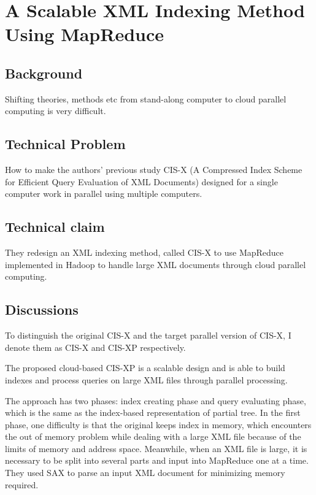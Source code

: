 \documentclass{paper}
\begin{document}
\section{A Scalable XML Indexing Method Using MapReduce}

\subsection{Background}

Shifting theories, methods etc from stand-along computer to cloud 
parallel computing is very difficult. 

\subsection{Technical Problem}

How to make the authors' previous study CIS-X (A Compressed Index
Scheme for Efficient Query Evaluation of XML Documents) designed for a
single computer work in parallel using multiple computers.
 
\subsection{Technical claim}

They redesign an XML indexing method, called CIS-X to use MapReduce
implemented in Hadoop to handle large XML documents through cloud
parallel computing.  

\subsection{Discussions}

To distinguish the original CIS-X and the target parallel version
of CIS-X, I denote them as CIS-X and CIS-XP respectively.

The proposed cloud-based CIS-XP is a scalable design and is able to
build indexes and process queries on large XML files through parallel
processing. 

The approach has two phases: index creating phase and query evaluating
phase, which is the same as the index-based representation of partial
tree.  In the first phase, one difficulty is that the original keeps
index in memory, which encounters the out of memory problem while
dealing with a large XML file because of the limits of memory and
address space. Meanwhile, when an XML file is large, it is necessary
to be split into several parts and input into MapReduce one at a time.
They used SAX to parse an input XML document for minimizing memory
required.
\end{document}
